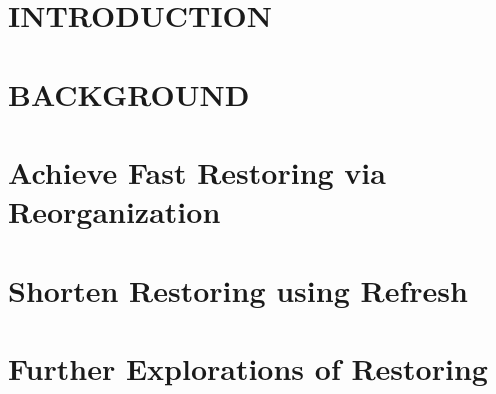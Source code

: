 \documentclass[driverfallback=dvipdfmx,final]{pittetd}
\begin{document}


\tableofcontents
%
%
\chapter{INTRODUCTION}
\label{chapter:intro}


\chapter{BACKGROUND}
\label{chapter:background}


\chapter{Achieve Fast Restoring via Reorganization}
\label{chapter:twr_reorganize}


\chapter{Shorten Restoring using Refresh}
\label{chapter:partialrestore}


\chapter{Further Explorations of Restoring}
\label{chapter:future_study}

\end{document}
